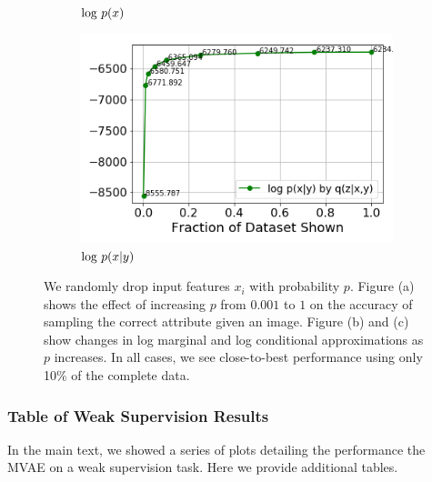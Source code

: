 \begin{figure}[h!]
\begin{subfigure}[b]{.24\linewidth}
        \caption{$\textup{log }p(x)$}
    \end{subfigure}
    \begin{subfigure}[b]{.24\linewidth}
        \includegraphics[width=\linewidth]{images/chapter3/weaksup/celeba19conditional}
        \caption{$\textup{log }p(x|y)$}
    \end{subfigure}
    \caption{We randomly drop input features $x_{i}$ with probability $p$. Figure (a) shows the effect of increasing $p$ from $0.001$ to $1$ on the  accuracy of sampling the correct attribute given an image. Figure (b) and (c) show changes in log marginal and log conditional approximations as $p$ increases. In all cases, we see close-to-best performance using only 10\% of the complete data.}
    \label{fig:dropout_prediction}
\end{figure}

\subsubsection{Table of Weak Supervision Results}

In the main text, we showed a series of plots detailing the performance the MVAE on a weak supervision task. Here we provide additional tables.

